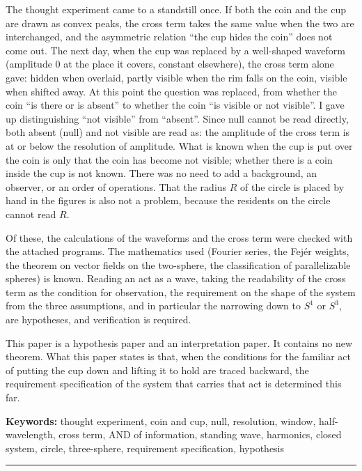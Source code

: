 \documentclass[
  a4paper,
]{article}
\begin{document}
The thought experiment came to a standstill once. If both the coin and
the cup are drawn as convex peaks, the cross term takes the same value
when the two are interchanged, and the asymmetric relation ``the cup
hides the coin'' does not come out. The next day, when the cup was
replaced by a well-shaped waveform (amplitude 0 at the place it covers,
constant elsewhere), the cross term alone gave: hidden when overlaid,
partly visible when the rim falls on the coin, visible when shifted
away. At this point the question was replaced, from whether the coin
``is there or is absent'' to whether the coin ``is visible or not
visible''. I gave up distinguishing ``not visible'' from ``absent''.
Since null cannot be read directly, both absent (null) and not visible
are read as: the amplitude of the cross term is at or below the
resolution of amplitude. What is known when the cup is put over the coin
is only that the coin has become not visible; whether there is a coin
inside the cup is not known. There was no need to add a background, an
observer, or an order of operations. That the radius \(R\) of the circle
is placed by hand in the figures is also not a problem, because the
residents on the circle cannot read \(R\).

Of these, the calculations of the waveforms and the cross term were
checked with the attached programs. The mathematics used (Fourier
series, the Fejér weights, the theorem on vector fields on the
two-sphere, the classification of parallelizable spheres) is known.
Reading an act as a wave, taking the readability of the cross term as
the condition for observation, the requirement on the shape of the
system from the three assumptions, and in particular the narrowing down
to \(S^1\) or \(S^3\), are hypotheses, and verification is required.

This paper is a hypothesis paper and an interpretation paper. It
contains no new theorem. What this paper states is that, when the
conditions for the familiar act of putting the cup down and lifting it
to hold are traced backward, the requirement specification of the system
that carries that act is determined this far.

\textbf{Keywords:} thought experiment, coin and cup, null, resolution,
window, half-wavelength, cross term, AND of information, standing wave,
harmonics, closed system, circle, three-sphere, requirement
specification, hypothesis

\begin{center}\rule{0.5\linewidth}{0.5pt}\end{center}
\end{document}
